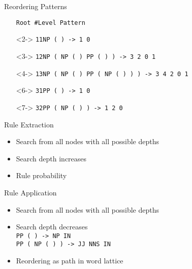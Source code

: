 \documentclass[18pt]{beamer}
\newcommand{\ul}[1]{{\color{red}{#1}}}
\begin{document}
\begin{frame}{Reordering Patterns}
\vspace{-0.2cm}
\begin{figure}
\centering

\end{figure}
\vspace{-0.3cm}
\begin{itemize}
\setlength{\itemsep}{0pt}
\setlength{\parskip}{0pt}
\setlength{\parsep}{0pt}
\scriptsize
\item[] \texttt{Root \#Level Pattern}
\item[]<2-> \texttt{1\hphantom{xxxx}1\hphantom{xxxxxx}NP ( \ul{NP} \ul{PP} ) -> 1 0}
\item[]<3-> \texttt{1\hphantom{xxxx}2\hphantom{xxxxxx}NP ( NP ( \ul{JJ} \ul{NNS} ) PP ( \ul{IN} \ul{NP} ) ) -> 3 2 0 1}
\item[]<4-> \texttt{1\hphantom{xxxx}3\hphantom{xxxxxx}NP ( NP ( \ul{JJ} \ul{NNS} ) PP ( \ul{IN} NP ( \ul{JJ} \ul{NNS} ) ) ) -> 3 4 2 0 1}
\item[]<6-> \texttt{3\hphantom{xxxx}1\hphantom{xxxxxx}PP ( \ul{IN} \ul{NP} ) -> 1 0}
\item[]<7-> \texttt{3\hphantom{xxxx}2\hphantom{xxxxxx}PP ( \ul{IN} NP ( \ul{JJ} \ul{NNS} ) ) -> 1 2 0}
\end{itemize}
\end{frame}

\begin{frame}{Rule Extraction}
\begin{itemize}[<+-| alert@+>]
\item Search from all nodes with all possible depths
\item Search depth increases
\item Rule probability
\end{itemize}
\end{frame}

\begin{frame}{Rule Application}
\begin{itemize}[<+-| alert@+>]
\item Search from all nodes with all possible depths
\item Search depth decreases \bigskip \\
\texttt{PP ( \ul{IN} \ul{NP} ) -> NP IN}\\
\texttt{PP ( \ul{IN} NP ( \ul{JJ} \ul{NNS} ) ) -> JJ NNS IN} \bigskip \\
\item Reordering as path in word lattice
\end{itemize}
\end{frame}
\end{document}
